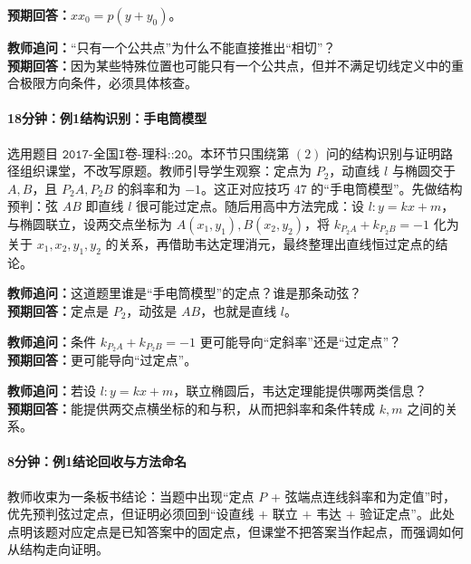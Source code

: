 \documentclass[UTF8,a4paper,11pt]{ctexart}
\begin{document}
\textbf{预期回答：}$xx_0=p(y+y_0)$。\par

\noindent\textbf{教师追问：}“只有一个公共点”为什么不能直接推出“相切”？\\

\textbf{预期回答：}因为某些特殊位置也可能只有一个公共点，但并不满足切线定义中的重合极限方向条件，必须具体核查。\par

\paragraph{18分钟：例1结构识别：手电筒模型}

选用题目 $\texttt{2017-全国I卷-理科::20}$。本环节只围绕第 $(2)$ 问的结构识别与证明路径组织课堂，不改写原题。教师引导学生观察：定点为 $P_2$，动直线 $l$ 与椭圆交于 $A,B$，且 $P_2A,P_2B$ 的斜率和为 $-1$。这正对应技巧 $47$ 的“手电筒模型”。先做结构预判：弦 $AB$ 即直线 $l$ 很可能过定点。随后用高中方法完成：设 $l:y=kx+m$，与椭圆联立，设两交点坐标为 $A(x_1,y_1),B(x_2,y_2)$，将 $k_{P_2A}+k_{P_2B}=-1$ 化为关于 $x_1,x_2,y_1,y_2$ 的关系，再借助韦达定理消元，最终整理出直线恒过定点的结论。

\noindent\textbf{教师追问：}这道题里谁是“手电筒模型”的定点？谁是那条动弦？\\

\textbf{预期回答：}定点是 $P_2$，动弦是 $AB$，也就是直线 $l$。\par

\noindent\textbf{教师追问：}条件 $k_{P_2A}+k_{P_2B}=-1$ 更可能导向“定斜率”还是“过定点”？\\

\textbf{预期回答：}更可能导向“过定点”。\par

\noindent\textbf{教师追问：}若设 $l:y=kx+m$，联立椭圆后，韦达定理能提供哪两类信息？\\

\textbf{预期回答：}能提供两交点横坐标的和与积，从而把斜率和条件转成 $k,m$ 之间的关系。\par

\paragraph{8分钟：例1结论回收与方法命名}

教师收束为一条板书结论：当题中出现“定点 $P$ + 弦端点连线斜率和为定值”时，优先预判弦过定点，但证明必须回到“设直线 $+$ 联立 $+$ 韦达 $+$ 验证定点”。此处点明该题对应定点是已知答案中的固定点，但课堂不把答案当作起点，而强调如何从结构走向证明。
\end{document}

